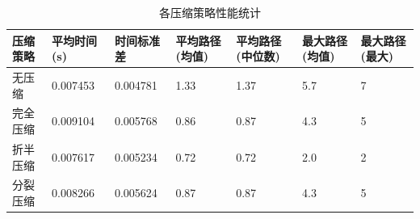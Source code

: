 \begin{table}
\caption{各压缩策略性能统计}
\label{tab:performance}
\begin{tabular}{lllllll}
\toprule
压缩策略 & 平均时间(s) & 时间标准差 & 平均路径(均值) & 平均路径(中位数) & 最大路径(均值) & 最大路径(最大) \\
\midrule
无压缩 & 0.007453 & 0.004781 & 1.33 & 1.37 & 5.7 & 7 \\
完全压缩 & 0.009104 & 0.005768 & 0.86 & 0.87 & 4.3 & 5 \\
折半压缩 & 0.007617 & 0.005234 & 0.72 & 0.72 & 2.0 & 2 \\
分裂压缩 & 0.008266 & 0.005624 & 0.87 & 0.87 & 4.3 & 5 \\
\bottomrule
\end{tabular}
\end{table}
